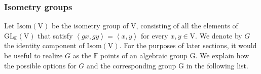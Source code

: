 \documentclass[12pt, reqno]{amsart}
\theoremstyle{definition}
\theoremstyle{definition}
\theoremstyle{definition}
\newcommand{\hermitianSpace}{\mathrm{V}}
\newcommand{\innerproduct}[2]{\left\langle #1,#2\right\rangle}
\newcommand{\GL}{\mathrm{GL}}
\newcommand{\finiteField}{\mathbb{F}}
\newcommand{\quadraticExtension}{\mathbb{E}}
\newcommand{\IsometryGroup}{\mathrm{Isom}}
\newcommand{\algebraicGroup}[1]{\boldsymbol{\mathrm{#1}}}
\begin{document}
\subsubsection{Isometry groups}\label{subsec:isometry-groups}
Let $\IsometryGroup \left(\hermitianSpace\right)$ be the isometry group of $\hermitianSpace$, consisting of all the elements of $\GL_{\quadraticExtension}\left(\hermitianSpace\right)$ that satisfy $\innerproduct{gx}{gy} = \innerproduct{x}{y}$ for every $x,y \in \hermitianSpace$. We denote by $G$ the identity component of $\IsometryGroup\left(\hermitianSpace\right)$. For the purposes of later sections, it would be useful to realize $G$ as the $\finiteField$ points of an algebraic group $\algebraicGroup{G}$. We explain how the possible options for $G$ and the corresponding group $\algebraicGroup{G}$ in the following list.
\end{document}
